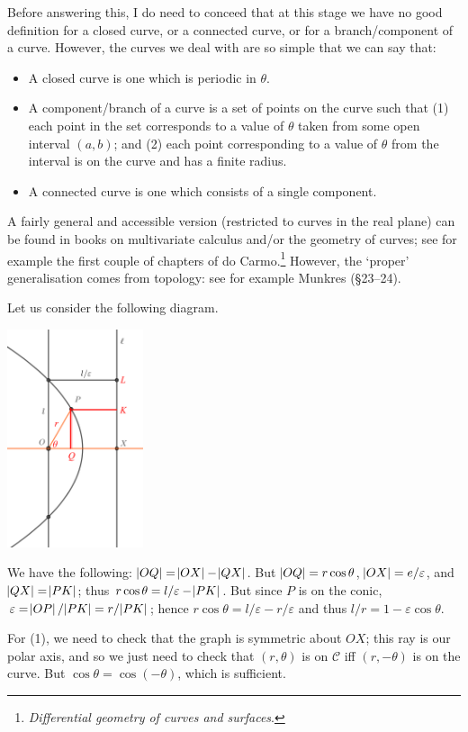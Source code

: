 \documentclass[a4paper,leqno,10pt]{article}
\theoremstyle{exercise}
\theoremstyle{plain}
\theoremstyle{definition}
\theoremstyle{remark}
\begin{document}
Before answering this, I do need to conceed that at this stage we have no good definition for a closed curve, or a connected curve, or
for a branch/component of a curve. However, the curves we deal with are so simple that we can say that:
\begin{itemize}
  \item A closed curve is one which is periodic in $ \theta $.
  \item A component/branch of a curve is a set of points on the curve such that (1) each point in the set
        corresponds to a value of $ \theta $ taken from some open interval $ (a,b) $; and (2) each point corresponding
        to a value of $\theta $ from the interval is on the curve and has a finite radius.
  \item A connected curve is one which consists of a single component.
\end{itemize}
A fairly general and accessible version (restricted to curves in the real plane) can be found in books on multivariate calculus and/or the
geometry of curves; see for example the first couple of chapters of do Carmo.\footnote{\emph{Differential geometry of curves and surfaces}.}
However, the `proper' generalisation comes from topology: see for example Munkres (\S 23--24).

Let us consider the following diagram.
\begin{center}
  \includegraphics[width=0.3\textwidth]{solutions1}
\end{center}
We have the following: $ \abs{OQ} = \abs{OX} - \abs{QX} $. But $ \abs{OQ} = r\cos \theta $, $ \abs{OX} = e/\varepsilon $, and $ \abs{QX} = \abs{PK} $;
thus $ r \cos \theta = l/\varepsilon - \abs{PK} $. But since $ P $ is on the conic, $ \varepsilon = \abs{OP}/\abs{PK} = r/\abs{PK} $;
hence $ r \cos \theta = l/\varepsilon - r/\varepsilon $ and thus $ l/r = 1 - \varepsilon \cos \theta $.

For (1), we need to check that the graph is symmetric about $ OX $; this ray is our polar axis, and so we just need to check that $ (r, \theta) $
is on $ \mathcal{C} $ iff $ (r, -\theta) $ is on the curve. But $ \cos \theta = \cos (-\theta) $, which is sufficient.
\end{document}
